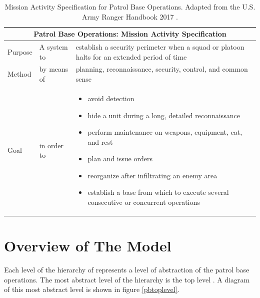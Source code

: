 \documentclass[../../main/main.tex]{subfiles}
\begin{document}
\parskip=8pt
\begin{table}[h!]
\begin{center}
\begin{tabular}{ | m{3.3em} | m{3.8cm}| m{9cm} | } 
\hline
\multicolumn{3}{|c|}{Patrol Base Operations: Mission Activity Specification} \\
\hline \hline
Purpose & A system to & establish a security perimeter when a squad or platoon halts for an extended period of time \\ 
\hline
Method & by means of  & planning, reconnaissance, security, control, and common sense  \\ 
\hline
Goal & in order to & 
\begin{itemize}
\item avoid detection
\item hide a unit during a long, detailed reconnaissance
\item perform maintenance on weapons, equipment, eat, and rest
\item plan and issue orders
\item reorganize after infiltrating an enemy area
\item establish a base from which to execute several consecutive or concurrent operations
\end{itemize}

 \\ 
\hline
\end{tabular}
\end{center}
\caption{Mission Activity Specification for Patrol Base Operations.  Adapted from the U.S. Army Ranger Handbook 2017 \cite{rangermanual}.}
\label{pbtab}
\end{table}
\parskip=18pt

%

\section{Overview of The Model}\label{sec:overview}

Each level of the hierarchy of  represents a level of abstraction of the patrol base operations. The most abstract level of the hierarchy is the top level .  A diagram of this most abstract level is shown in figure \ref{pbtoplevel}.
\end{document}
